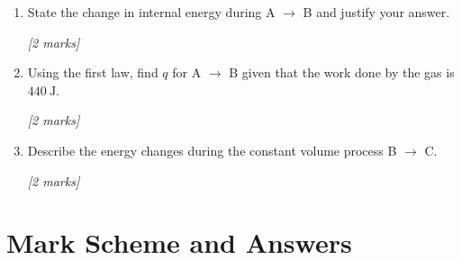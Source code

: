 \begin{tcolorbox}[colback=white, colframe=midblue, breakable]
\begin{minipage}{\linewidth}
\begin{enumerate}[label=(\alph*)]
  \item \begin{minipage}[t]{\linewidth}
  State the change in internal energy during A $\to$ B and justify your answer.
  \par\hfill\textit{[2 marks]}
  \vspace{2.5cm}
  \end{minipage}

  \item \begin{minipage}[t]{\linewidth}
  Using the first law, find $q$ for A $\to$ B given that the work done by the gas is $440\ \text{J}$.
  \par\hfill\textit{[2 marks]}
  \vspace{3cm}
  \end{minipage}

  \item \begin{minipage}[t]{\linewidth}
  Describe the energy changes during the constant volume process B $\to$ C.
  \par\hfill\textit{[2 marks]}
  \vspace{3cm}
  \end{minipage}
\end{enumerate}
\end{minipage}

\end{tcolorbox}

\section{Mark Scheme and Answers}


